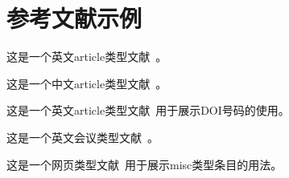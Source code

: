 \chapter{参考文献示例}
这是一个英文article类型文献~\cite{ChangHTD19}。
\par
这是一个中文article类型文献~\cite{WangZSS21}。
\par
这是一个英文article类型文献~\cite{GongL21}用于展示DOI号码的使用。
\par
这是一个英文会议类型文献~\cite{TsaiCLQLB13}。
\par
这是一个网页类型文献~\cite{Collinson21}用于展示misc类型条目的用法。
